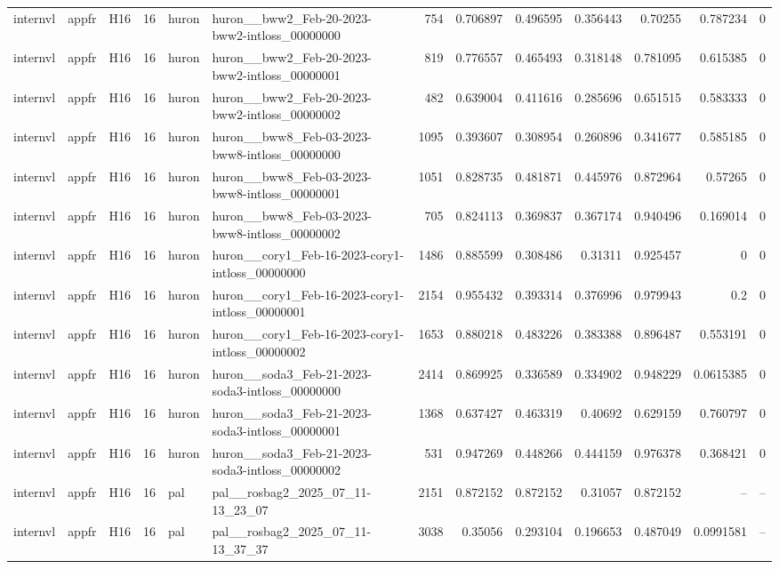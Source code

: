\begin{longtable}{lllrllrrrrrrr}
internvl & appfr & H16 & 16 & huron & huron\_\_bww2\_Feb-20-2023-bww2-intloss\_00000000 & 754 & 0.706897 & 0.496595 & 0.356443 & 0.70255 & 0.787234 & 0 \\
internvl & appfr & H16 & 16 & huron & huron\_\_bww2\_Feb-20-2023-bww2-intloss\_00000001 & 819 & 0.776557 & 0.465493 & 0.318148 & 0.781095 & 0.615385 & 0 \\
internvl & appfr & H16 & 16 & huron & huron\_\_bww2\_Feb-20-2023-bww2-intloss\_00000002 & 482 & 0.639004 & 0.411616 & 0.285696 & 0.651515 & 0.583333 & 0 \\
internvl & appfr & H16 & 16 & huron & huron\_\_bww8\_Feb-03-2023-bww8-intloss\_00000000 & 1095 & 0.393607 & 0.308954 & 0.260896 & 0.341677 & 0.585185 & 0 \\
internvl & appfr & H16 & 16 & huron & huron\_\_bww8\_Feb-03-2023-bww8-intloss\_00000001 & 1051 & 0.828735 & 0.481871 & 0.445976 & 0.872964 & 0.57265 & 0 \\
internvl & appfr & H16 & 16 & huron & huron\_\_bww8\_Feb-03-2023-bww8-intloss\_00000002 & 705 & 0.824113 & 0.369837 & 0.367174 & 0.940496 & 0.169014 & 0 \\
internvl & appfr & H16 & 16 & huron & huron\_\_cory1\_Feb-16-2023-cory1-intloss\_00000000 & 1486 & 0.885599 & 0.308486 & 0.31311 & 0.925457 & 0 & 0 \\
internvl & appfr & H16 & 16 & huron & huron\_\_cory1\_Feb-16-2023-cory1-intloss\_00000001 & 2154 & 0.955432 & 0.393314 & 0.376996 & 0.979943 & 0.2 & 0 \\
internvl & appfr & H16 & 16 & huron & huron\_\_cory1\_Feb-16-2023-cory1-intloss\_00000002 & 1653 & 0.880218 & 0.483226 & 0.383388 & 0.896487 & 0.553191 & 0 \\
internvl & appfr & H16 & 16 & huron & huron\_\_soda3\_Feb-21-2023-soda3-intloss\_00000000 & 2414 & 0.869925 & 0.336589 & 0.334902 & 0.948229 & 0.0615385 & 0 \\
internvl & appfr & H16 & 16 & huron & huron\_\_soda3\_Feb-21-2023-soda3-intloss\_00000001 & 1368 & 0.637427 & 0.463319 & 0.40692 & 0.629159 & 0.760797 & 0 \\
internvl & appfr & H16 & 16 & huron & huron\_\_soda3\_Feb-21-2023-soda3-intloss\_00000002 & 531 & 0.947269 & 0.448266 & 0.444159 & 0.976378 & 0.368421 & 0 \\
internvl & appfr & H16 & 16 & pal & pal\_\_rosbag2\_2025\_07\_11-13\_23\_07 & 2151 & 0.872152 & 0.872152 & 0.31057 & 0.872152 & -- & -- \\
internvl & appfr & H16 & 16 & pal & pal\_\_rosbag2\_2025\_07\_11-13\_37\_37 & 3038 & 0.35056 & 0.293104 & 0.196653 & 0.487049 & 0.0991581 & -- \\

\end{longtable}
